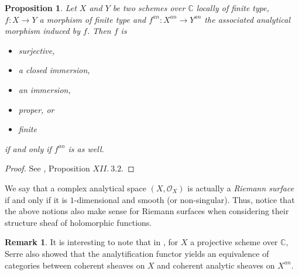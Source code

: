 \documentclass{article}
\theoremstyle{plain}
\newtheorem{proposition}[theorem]{Proposition}
\theoremstyle{definition}
\newtheorem{remark}{Remark}
\begin{document}
\begin{proposition}
\label{analytification_morphisms}
    Let $X$ and $Y$ be two schemes over $\mathbb{C}$ locally of finite type, $f:X\rightarrow Y$ a morphism of finite type and 
    $f^{an}: X^{an}\rightarrow Y^{an}$ the associated analytical morphism induced by $f$. 
    Then $f$ is 
    \begin{itemize}
        \item[$a)$] surjective,
        \item[$b)$] a closed immersion,
        \item[$c)$] an immersion,
        \item[$d)$] proper, or
        \item[$e)$] finite
    \end{itemize}
    if and only if $f^{an}$ is as well.
\end{proposition}
\begin{proof}
    See \cite{SGA}, Proposition $XII.\:3.2$.
\end{proof}

\noindent 
We say that a complex analytical space $(X,\mathcal{O}_X)$ is actually a \textit{Riemann surface} if and only if it is $1$-dimensional and smooth (or non-singular). 
Thus, notice that the above notions also make sense for Riemann surfaces when considering their structure sheaf of holomorphic functions. 
\begin{remark}
    It is interesting to note that in \cite{Serre}, for $X$ a projective scheme over $\mathbb{C}$,
    Serre also showed that the analytification functor yields an equivalence of categories between coherent sheaves on $X$ and coherent analytic sheaves on $X^{an}$.
\end{remark}





\nocite{*}
\end{document}
